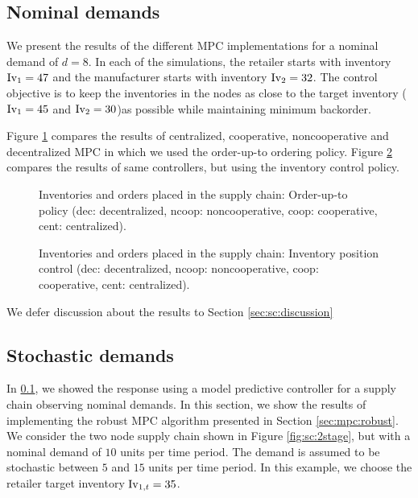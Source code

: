 \subsection{Nominal demands}
\label{sec:sc:supplychain_example:nominal}
We present the results of the different MPC
implementations for a nominal demand of $d = 8$. In each of the
simulations, the retailer starts with inventory $\textrm{Iv}_1 = 47$ and the
manufacturer starts with inventory $\textrm{Iv}_2 = 32$. The control objective
is to keep the inventories in the nodes as close to the target
inventory ($\textrm{Iv}_1 = 45$ and $\textrm{Iv}_2 = 30$)as possible while maintaining minimum backorder. 

Figure \ref{fig:sc:orderupto} compares the results of centralized,
cooperative, noncooperative and decentralized MPC in which we used the
order-up-to ordering policy.  Figure \ref{fig:sc:IP_x} compares the
results of same controllers, but using the inventory control policy.
\begin{figure}
\centering
\scriptsize
\resizebox{\textwidth}{!}{}
\resizebox{\textwidth}{!}{}
\caption{Inventories and orders placed in the supply chain: Order-up-to policy (dec:
  decentralized, ncoop: noncooperative, coop: cooperative, cent: centralized).}
\label{fig:sc:orderupto}
\end{figure}

\begin{figure}
\centering
\scriptsize
\resizebox{\textwidth}{!}{}
\resizebox{\textwidth}{!}{}
\caption{Inventories and orders placed in the supply chain: Inventory position control (dec:
  decentralized, ncoop: noncooperative, coop: cooperative, cent: centralized).}
\label{fig:sc:IP_x}
\end{figure}

We defer discussion about the results to Section \ref{sec:sc:discussion}

\subsection{Stochastic demands}
\label{sec:sc:supplycahin_example:robust}
In \ref{sec:sc:supplychain_example:nominal}, we showed the response
using a model predictive controller for a supply chain observing
nominal demands. In this section, we show the results of implementing
the robust MPC algorithm presented in Section \ref{sec:mpc:robust}. We
consider the two node supply chain shown in Figure
\ref{fig:sc:2stage}, but with a nominal demand of $10$ units per time
period. The demand is assumed to be stochastic between $5$ and $15$
units per time period. In this example, we choose the retailer target
inventory $\textrm{Iv}_{1,t} = 35$. 

